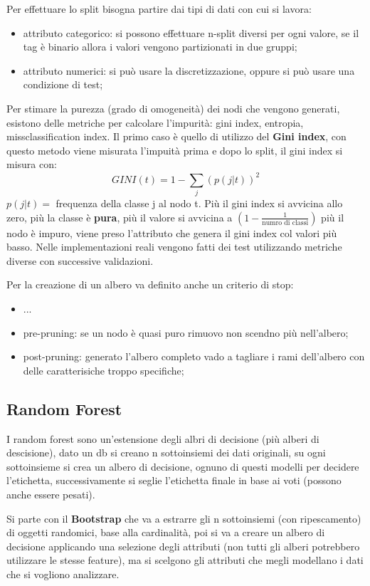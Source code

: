 \documentclass[12pt]{article}
\begin{document}
Per effettuare lo split bisogna partire dai tipi di dati con cui si lavora:
\begin{itemize}
    \item attributo categorico: si possono effettuare n-split diversi per ogni valore, se il tag \`e binario allora i valori vengono partizionati in due gruppi;
    \item attributo numerici: si pu\`o usare la discretizzazione, oppure si pu\`o usare una condizione di test;
\end{itemize}

Per stimare la purezza (grado di omogeneit\`a) dei nodi che vengono generati, esistono delle metriche per calcolare l'impurit\`a: gini index, entropia, missclassification index. Il primo caso \`e quello di utilizzo del \textbf{Gini index}, con questo metodo viene misurata l'impuit\`a prima e dopo lo split, il gini index si misura con:
\[ GINI(t) = 1 - \sum_{j}^{} (p(j|t))^{2} \]
$p(j|t) = $ frequenza della classe j al nodo t. Pi\`u il gini index si avvicina allo zero, pi\`u la classe \`e \textbf{pura}, pi\`u il valore si avvicina a $(1 - \frac{1}{\text{numro di classi}} )$ pi\`u il nodo \`e impuro, viene preso l'attributo che genera il gini index col valori pi\`u basso. Nelle implementazioni reali vengono fatti dei test utilizzando metriche diverse con successive validazioni.

Per la creazione di un albero va definito anche un criterio di stop:
\begin{itemize}
    \item ...
    \item pre-pruning: se un nodo \`e quasi puro rimuovo non scendno pi\`u nell'albero;
    \item post-pruning: generato l'albero completo vado a tagliare i rami dell'albero con delle caratterisiche troppo specifiche;
\end{itemize}



\subsection{Random Forest}
I random forest sono un'estensione degli albri di decisione (pi\`u alberi di descisione), dato un db si creano n sottoinsiemi dei dati originali, su ogni sottoinsieme si crea un albero di decisione, ognuno di questi modelli per decidere l'etichetta, successivamente si seglie l'etichetta finale in base ai voti (possono anche essere pesati).

Si parte con il \textbf{Bootstrap} che va a estrarre gli n sottoinsiemi (con ripescamento) di oggetti randomici, base alla cardinalit\`a, poi si va a creare un albero di decisione applicando una selezione degli attributi (non tutti gli alberi potrebbero utilizzare le stesse feature), ma si scelgono gli attributi che megli modellano i dati che si vogliono analizzare.
\end{document}
